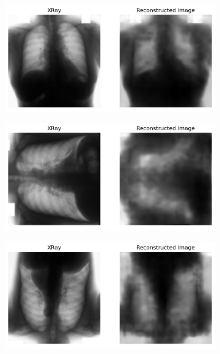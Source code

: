   \begin{figure}[htbp]
    \centering
    \begin{subfigure}{0.9\linewidth}
        \centering
        \includegraphics[width=\linewidth]{../plots/unsupervised-orientation/result-up.png}
        \caption{ }
        \label{fig:unsup-orientation-up}
    \end{subfigure}
    \begin{subfigure}{0.9\linewidth}
        \centering
        \includegraphics[width=\linewidth]{../plots/unsupervised-orientation/result-right.png}
        \caption{ }
        \label{fig:unsup-orienation-right}
    \end{subfigure}
    \begin{subfigure}{0.9\linewidth}
        \centering
        \includegraphics[width=\linewidth]{../plots/unsupervised-orientation/result-down.png}

\end{subfigure}
\end{figure}
